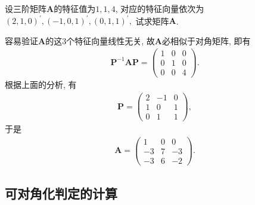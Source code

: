 \documentclass[../../main.tex]{subfiles}%
\begin{document}
\begin{example}
设三阶矩阵\(\boldsymbol{A}\)的特征值为\(1,1,4\), 对应的特征向量依次为
\((2,1,0)^{\prime},(-1,0,1)^{\prime},(0,1,1)^{\prime},\)
试求矩阵\(\boldsymbol{A}\).
\end{example}
\begin{solution}

容易验证\(\boldsymbol{A}\)的这\(3\)个特征向量线性无关, 故\(\boldsymbol{A}\)必相似于对角矩阵, 即有
\begin{align*}
\boldsymbol{P}^{-1}\boldsymbol{AP}=\begin{pmatrix}
1&0&0\\
0&1&0\\
0&0&4
\end{pmatrix}.
\end{align*}
根据上面的分析, 有
\begin{align*}
\boldsymbol{P}=\begin{pmatrix}
2&-1&0\\
1&0&1\\
0&1&1
\end{pmatrix},
\end{align*}
于是
\begin{align*}
\boldsymbol{A}=\begin{pmatrix}
1&0&0\\
-3&7&-3\\
-3&6&-2
\end{pmatrix}. 
\end{align*} 

\end{solution}

\subsection{可对角化判定的计算}
\end{document}
